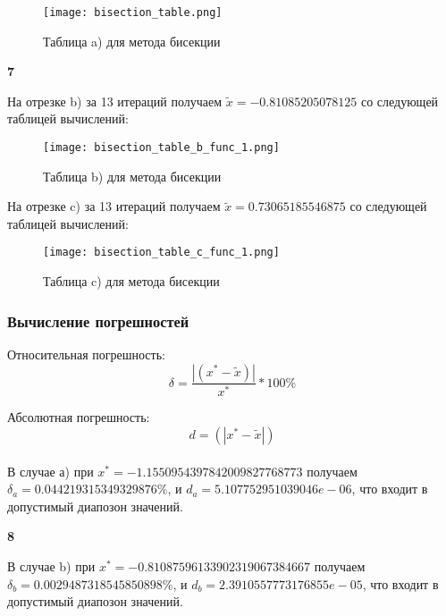 \documentclass[a4paper,12pt]{article}
\begin{document}
\begin{figure}[h]
    \centering
    \texttt{[image: bisection\_table.png]}
    \caption{Таблица a) для метода бисекции}
    \label{bisection_graph}
\end{figure}


\newpage

\begin{center}
{\bf7}\\
\vspace{0.5cm}
\end{center}
\setcounter{page}{7}
На отрезке b) за 13 итераций получаем $\tilde{x} = -0.81085205078125$ со следующей таблицей вычислений: \\

\begin{figure}[h]
    \centering
    \texttt{[image: bisection\_table\_b\_func\_1.png]}
    \caption{Таблица b) для метода бисекции}
    \label{bisection_graph}
\end{figure}


На отрезке c) за 13 итераций получаем $ \tilde{x}= 0.73065185546875$ со следующей таблицей вычислений: \\

\begin{figure}[h]
    \centering
    \texttt{[image: bisection\_table\_c\_func\_1.png]}
    \caption{Таблица c) для метода бисекции}
    \label{bisection_graph}
\end{figure}


\subsubsection{Вычисление погрешностей}\label{error}
Относительная погрешность:
\begin{equation}
\delta = \frac{|(x^* - \tilde{x})|}{x^*} * 100\%
    \label{eqn:relative}
\end{equation}

Абсолютная погрешность:
\begin{equation}
d = (|x^* - \tilde{x}|)
    \label{eqn:relative}
\end{equation}\\

В случае а) при $x^* = -1.1550954397842009827768773$ получаем $\delta_a = 0.044219315349329876 \%$, и $d_a = 5.107752951039046e-06$, что входит в допустимый диапозон значений.\\
\newpage

\begin{center}
{\bf8}\\
\vspace{0.5cm}
\end{center}
\setcounter{page}{8}
В случае b) при $x^* = -0.81087596133902319067384667$ получаем $\delta_b = 0.0029487318545850898 \%$, и $d_b = 2.3910557773176855e-05$, что входит в допустимый диапозон значений. \\
\end{document}
